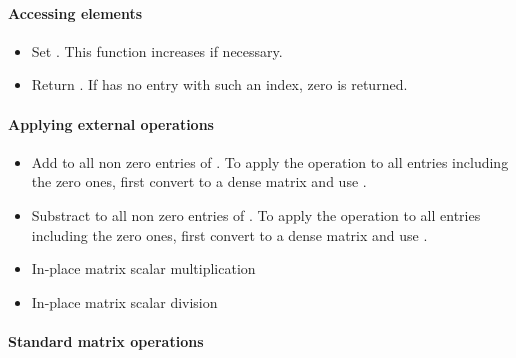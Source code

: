 \paragraph{Accessing elements}

\begin{itemize}
\item {}
  \sshortdescribe Set . This function increases 
  if necessary.
\item {}
  \sshortdescribe Return . If  has no entry with such an
  index, zero is returned.
\end{itemize}

\paragraph{Applying external operations}

\begin{itemize}
\item {}
  \sshortdescribe Add  to all non zero entries of . To apply the
  operation to all entries including the zero ones, first convert  to
  a dense matrix and use .
\item {}
  \sshortdescribe Substract  to all non zero entries of . To apply the
  operation to all entries including the zero ones, first convert  to
  a dense matrix and use .
\item {}
  \sshortdescribe In-place matrix scalar multiplication
\item {}
  \sshortdescribe In-place matrix scalar division
\end{itemize}


\paragraph{Standard matrix operations}

